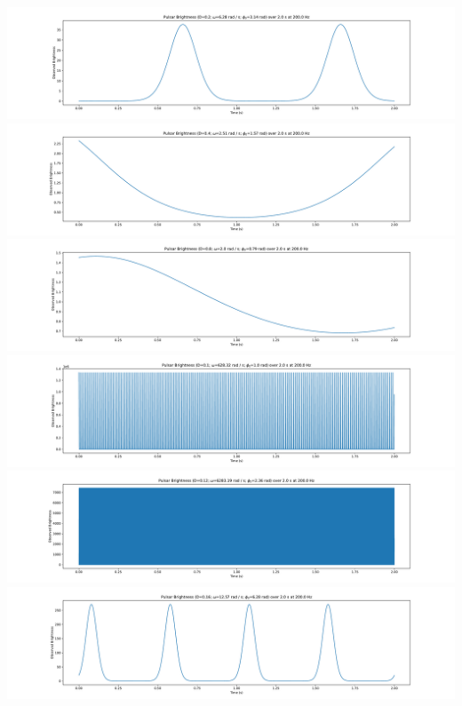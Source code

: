 \documentclass{article}
\begin{document}
\includegraphics[width=\textwidth]{search_template_brightness_0.pdf}
\includegraphics[width=\textwidth]{search_template_brightness_1.pdf}
\includegraphics[width=\textwidth]{search_template_brightness_2.pdf}
\includegraphics[width=\textwidth]{search_template_brightness_3.pdf}
\includegraphics[width=\textwidth]{search_template_brightness_4.pdf}
\includegraphics[width=\textwidth]{search_template_brightness_5.pdf}
\end{document}
